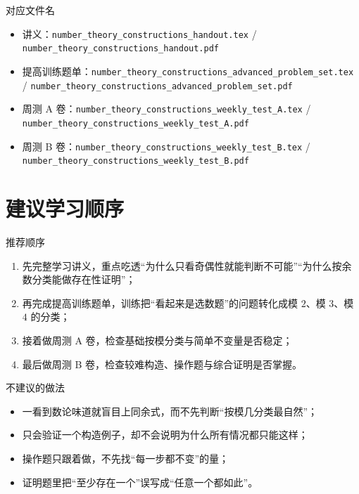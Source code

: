 \documentclass[11pt,a4paper,fontset=fandol]{ctexart}
\begin{document}
\begin{infobox}{对应文件名}
\begin{itemize}
  \item 讲义：\texttt{number\_theory\_constructions\_handout.tex} / \texttt{number\_theory\_constructions\_handout.pdf}
  \item 提高训练题单：\texttt{number\_theory\_constructions\_advanced\_problem\_set.tex} / \texttt{number\_theory\_constructions\_advanced\_problem\_set.pdf}
  \item 周测 A 卷：\texttt{number\_theory\_constructions\_weekly\_test\_A.tex} / \texttt{number\_theory\_constructions\_weekly\_test\_A.pdf}
  \item 周测 B 卷：\texttt{number\_theory\_constructions\_weekly\_test\_B.tex} / \texttt{number\_theory\_constructions\_weekly\_test\_B.pdf}
\end{itemize}
\end{infobox}

\section{建议学习顺序}

\begin{goalbox}{推荐顺序}
\begin{enumerate}
  \item 先完整学习讲义，重点吃透“为什么只看奇偶性就能判断不可能”“为什么按余数分类能做存在性证明”；
  \item 再完成提高训练题单，训练把“看起来是选数题”的问题转化成模 $2$、模 $3$、模 $4$ 的分类；
  \item 接着做周测 A 卷，检查基础按模分类与简单不变量是否稳定；
  \item 最后做周测 B 卷，检查较难构造、操作题与综合证明是否掌握。
\end{enumerate}
\end{goalbox}

\begin{warnbox}{不建议的做法}
\begin{itemize}
  \item 一看到数论味道就盲目上同余式，而不先判断“按模几分类最自然”；
  \item 只会验证一个构造例子，却不会说明为什么所有情况都只能这样；
  \item 操作题只跟着做，不先找“每一步都不变”的量；
  \item 证明题里把“至少存在一个”误写成“任意一个都如此”。
\end{itemize}
\end{warnbox}
\end{document}
